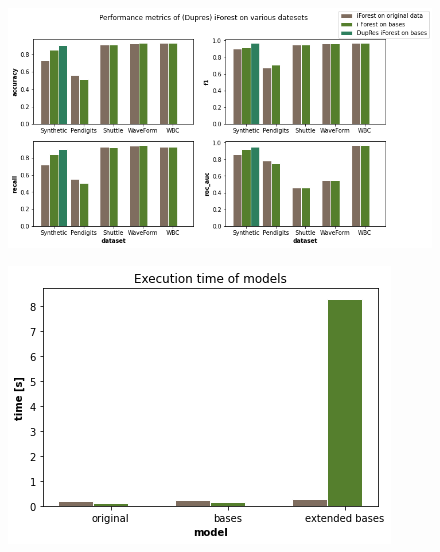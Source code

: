 



\begin{figure}
  \centering
  \includegraphics[width=\linewidth]{images/performance_metrics.png}
  \caption{}
  \label{fig:performance_metrics}
\end{figure}

\begin{figure}
  \centering
  \includegraphics[width=0.8\linewidth]{images/performance_time.png}
  \caption{}
  \label{fig:performance_time}
\end{figure}